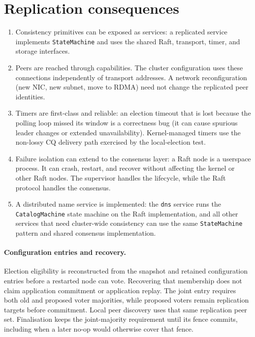 \section{Replication consequences}

\begin{enumerate}
    \item Consistency primitives can be exposed as services: a replicated
        service implements \texttt{StateMachine} and uses the shared Raft,
        transport, timer, and storage interfaces.

    \item Peers are reached through capabilities. The cluster configuration
        uses these connections independently of transport addresses.
        A network reconfiguration (new NIC, new subnet, move to RDMA)
        need not change the replicated peer identities.

    \item Timers are first-class and reliable: an election timeout
        that is lost because the polling loop missed its window is a correctness
        bug (it can cause spurious leader changes or extended unavailability).
        Kernel-managed timers use the non-lossy CQ delivery path exercised by
        the local-election test.

    \item Failure isolation can extend to the consensus layer: a Raft
        node is a userspace process. It can crash, restart, and recover without
        affecting the kernel or other Raft nodes. The supervisor handles the
        lifecycle, while the Raft protocol handles the consensus.

    \item A distributed name service is implemented: the
        \texttt{dns} service runs the \texttt{CatalogMachine} state machine
        on the Raft implementation, and all other services that need cluster-wide
        consistency can use the same \texttt{StateMachine} pattern and shared
        consensus implementation.
\end{enumerate}

\paragraph*{Configuration entries and recovery.}
Election eligibility is reconstructed from the snapshot and retained configuration
entries before a restarted node can vote.  Recovering that membership does not
claim application commitment or application replay.  The joint entry requires both
old and proposed voter majorities, while proposed voters remain replication targets
before commitment.  Local peer discovery uses that same replication peer set.
Finalisation keeps the joint-majority requirement until its
fence commits, including when a later no-op would otherwise cover that fence.


